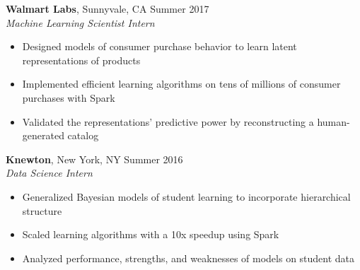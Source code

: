 \documentclass{res}
\begin{document}
\begin{resume}
\textbf{Walmart Labs}, Sunnyvale, CA \hfill{Summer 2017}\\
\textit{Machine Learning Scientist Intern}
\begin{itemize}
\item Designed models of consumer purchase behavior to learn latent representations of products
\item Implemented efficient learning algorithms on tens of millions of consumer purchases with Spark
\item Validated the representations' predictive power by reconstructing a human-generated catalog
\end{itemize}


\textbf{Knewton}, New York, NY \hfill{Summer 2016}\\
\textit{Data Science Intern}
\begin{itemize}
\item Generalized Bayesian models of student learning to incorporate hierarchical structure 
\item Scaled learning algorithms with a 10x speedup using Spark
\item Analyzed performance, strengths, and weaknesses of models on student data
\end{itemize}

\begin{comment}
\textbf{Big Data Summer Institute}, University of Michigan, Ann Arbor, MI \hfill Summer 2015
\\ \textit{Intern}
\begin{itemize}
\item Implemented a search and counting algorithm for sub-sequences of the human genome
\item Attended lectures on machine learning, algorithms, data science, and statistics 
\item Presented work to faculty and undergraduates to promote the program to other institutions
\end{itemize}
\end{comment}


\end{resume}
\end{document}
